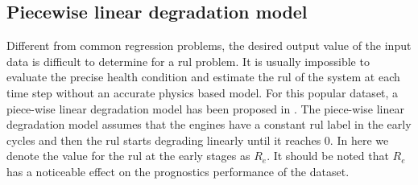 \subsection{Piecewise linear degradation model}

Different from common regression problems, the desired output value of the input data is difficult to determine for a \gls{rul} problem. It is usually impossible to evaluate the precise health condition and estimate the \gls{rul} of the system at each time step without an accurate physics based model. For this popular dataset, a piece-wise linear degradation model has been proposed in . The piece-wise linear degradation model assumes that the engines have a constant \gls{rul} label in the early cycles and then the \gls{rul} starts degrading linearly until it reaches 0. In here we denote the value for the \gls{rul} at the early stages as $R_e$. It should be noted that $R_e$ has a noticeable effect on the prognostics performance of the dataset. 

